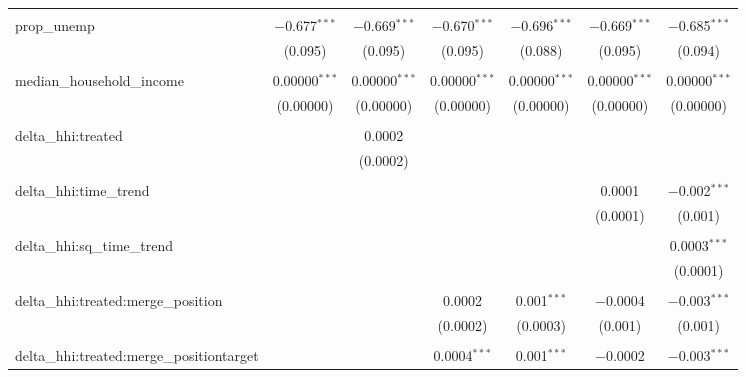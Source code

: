 \begin{table}[H]
{\begin{tabular}{@{\extracolsep{5pt}}lcccccc}
   & & & & & & \\  

  prop\_unemp & $-$0.677$^{***}$ & $-$0.669$^{***}$ & $-$0.670$^{***}$ & $-$0.696$^{***}$ & $-$0.669$^{***}$ & $-$0.685$^{***}$ \\  

   & (0.095) & (0.095) & (0.095) & (0.088) & (0.095) & (0.094) \\  

   & & & & & & \\  

  median\_household\_income & 0.00000$^{***}$ & 0.00000$^{***}$ & 0.00000$^{***}$ & 0.00000$^{***}$ & 0.00000$^{***}$ & 0.00000$^{***}$ \\  

   & (0.00000) & (0.00000) & (0.00000) & (0.00000) & (0.00000) & (0.00000) \\  

   & & & & & & \\  

  delta\_hhi:treated &  & 0.0002 &  &  &  &  \\  

   &  & (0.0002) &  &  &  &  \\  

   & & & & & & \\  

  delta\_hhi:time\_trend &  &  &  &  & 0.0001 & $-$0.002$^{***}$ \\  

   &  &  &  &  & (0.0001) & (0.001) \\  

   & & & & & & \\  

  delta\_hhi:sq\_time\_trend &  &  &  &  &  & 0.0003$^{***}$ \\  

   &  &  &  &  &  & (0.0001) \\  

   & & & & & & \\  

  delta\_hhi:treated:merge\_position &  &  & 0.0002 & 0.001$^{***}$ & $-$0.0004 & $-$0.003$^{***}$ \\  

   &  &  & (0.0002) & (0.0003) & (0.001) & (0.001) \\  

   & & & & & & \\  

  delta\_hhi:treated:merge\_positiontarget &  &  & 0.0004$^{***}$ & 0.001$^{***}$ & $-$0.0002 & $-$0.003$^{***}$ \\  


\end{tabular}}
\end{table}
